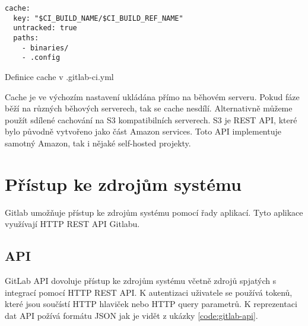 \begin{listing}[ht]
\begin{verbatim}
cache:
  key: "$CI_BUILD_NAME/$CI_BUILD_REF_NAME"
  untracked: true
  paths:
    - binaries/
    - .config
\end{verbatim}
\caption{Definice cache v .gitlab-ci.yml}
\end{listing}
 
Cache je ve výchozím nastavení ukládána přímo na běhovém serveru.
Pokud fáze běží na různých běhových serverech, tak se cache nesdílí.
Alternativně můžeme použít sdílené cachování na S3 kompatibilních serverech.
S3 je REST API, které bylo původně vytvořeno jako část Amazon services.
Toto API implementuje samotný Amazon, tak i nějaké self-hosted projekty.


\section{Přístup ke zdrojům systému}

Gitlab umožňuje přístup ke zdrojům systému pomocí řady aplikací.
Tyto aplikace využívají HTTP REST API Gitlabu. 

\subsection{API}

GitLab API dovoluje přístup ke zdrojům systému včetně zdrojů spjatých s integrací pomocí HTTP REST API.
K autentizaci uživatele se používá tokenů, které jsou součístí HTTP hlaviček nebo HTTP query parametrů.
K reprezentaci dat API požívá formátu JSON jak je vidět z ukázky \ref{code:gitlab-api}.

